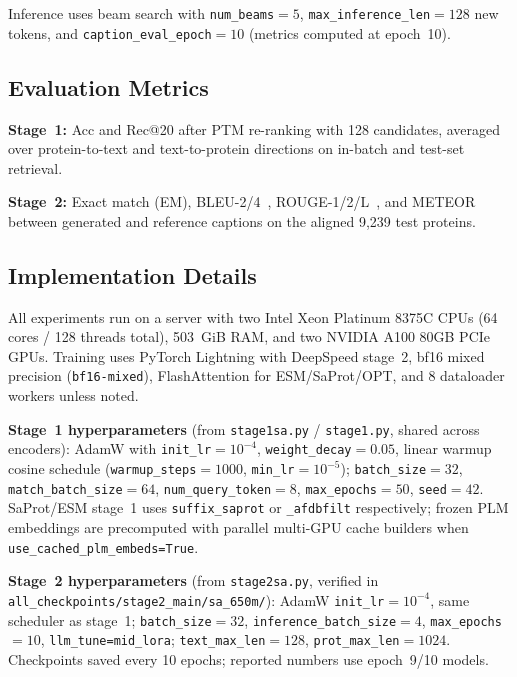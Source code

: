 \documentclass[conference]{IEEEtran}
\begin{document}
Inference uses beam search with \texttt{num\_beams}${=}5$, \texttt{max\_inference\_len}${=}128$ new tokens, and \texttt{caption\_eval\_epoch}${=}10$ (metrics computed at epoch~10).

\subsection{Evaluation Metrics}

\textbf{Stage~1:} Acc and Rec@20 after PTM re-ranking with 128 candidates, averaged over protein-to-text and text-to-protein directions on in-batch and test-set retrieval.

\textbf{Stage~2:} Exact match (EM), BLEU-2/4~\cite{papineni2002bleu}, ROUGE-1/2/L~\cite{lin2004rouge}, and METEOR~\cite{banerjee2005meteor} between generated and reference captions on the aligned 9{,}239 test proteins.

\subsection{Implementation Details}

All experiments run on a server with two Intel Xeon Platinum 8375C CPUs (64 cores / 128 threads total), 503~GiB RAM, and two NVIDIA A100 80GB PCIe GPUs.
Training uses PyTorch Lightning with DeepSpeed stage~2, bf16 mixed precision (\texttt{bf16-mixed}), FlashAttention for ESM/SaProt/OPT, and 8 dataloader workers unless noted.

\textbf{Stage~1 hyperparameters} (from \texttt{stage1sa.py} / \texttt{stage1.py}, shared across encoders):
AdamW with \texttt{init\_lr}${=}10^{-4}$, \texttt{weight\_decay}${=}0.05$, linear warmup cosine schedule (\texttt{warmup\_steps}${=}1000$, \texttt{min\_lr}${=}10^{-5}$);
\texttt{batch\_size}${=}32$, \texttt{match\_batch\_size}${=}64$, \texttt{num\_query\_token}${=}8$, \texttt{max\_epochs}${=}50$, \texttt{seed}${=}42$.
SaProt/ESM stage~1 uses \texttt{suffix}\texttt{\_saprot} or \texttt{\_afdbfilt} respectively; frozen PLM embeddings are precomputed with parallel multi-GPU cache builders when \texttt{use\_cached\_plm\_embeds=True}.

\textbf{Stage~2 hyperparameters} (from \texttt{stage2sa.py}, verified in \texttt{all\_checkpoints/stage2\_main/sa\_650m/}):
AdamW \texttt{init\_lr}${=}10^{-4}$, same scheduler as stage~1;
\texttt{batch\_size}${=}32$, \texttt{inference\_batch\_size}${=}4$, \texttt{max\_epochs}${=}10$, \texttt{llm\_tune=mid\_lora};
\texttt{text\_max\_len}${=}128$, \texttt{prot\_max\_len}${=}1024$.
Checkpoints saved every 10 epochs; reported numbers use epoch~9/10 models.
\end{document}
